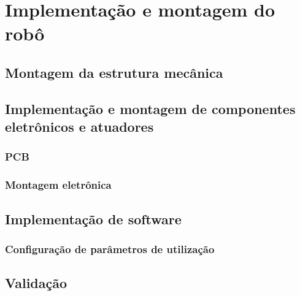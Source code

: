 

    \chapter{Implementação e montagem do robô}\label{cap: Implementação e montagem do robô}

    \section{\textbf{Montagem da estrutura mecânica}}

    \section{\textbf{Implementação e montagem de componentes eletrônicos e atuadores}}

    \subsection{PCB}

    \subsection{Montagem eletrônica}

    \section{\textbf{Implementação de software}}

    \subsection{Configuração de parâmetros de utilização}

    \section{\textbf{Validação}}

